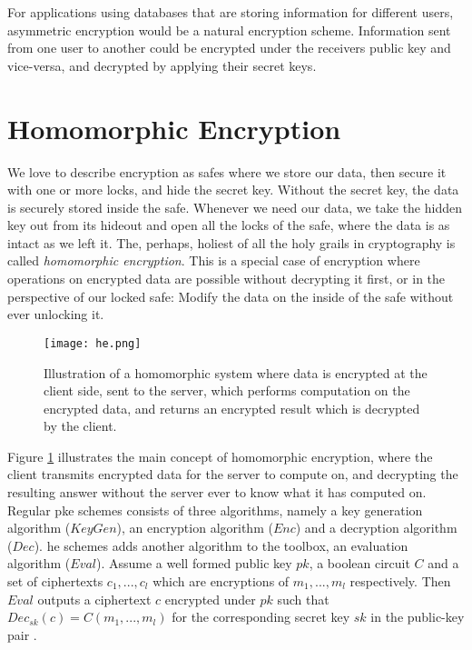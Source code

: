 For applications using databases that are storing information for different users, asymmetric encryption would be a natural encryption scheme. Information sent from one user to another could be encrypted under the receivers public key and vice-versa, and decrypted by applying their secret keys.

\section{Homomorphic Encryption}

We love to describe encryption as safes where we store our data, then secure it with one or more locks, and hide the secret key. Without the secret key, the data is securely stored inside the safe. Whenever we need our data, we take the hidden key out from its hideout and open all the locks of the safe, where the data is as intact as we left it. The, perhaps, holiest of all the holy grails in cryptography is called \emph{homomorphic encryption}. This is a special case of encryption where operations on encrypted data are possible without decrypting it first, or in the perspective of our locked safe: Modify the data on the inside of the safe without ever unlocking it.

\begin{figure}[h]
	\centering
	\texttt{[image: he.png]}
	\caption{Illustration of a homomorphic system where data is encrypted at the client side, sent to the server, which performs computation on the encrypted data, and returns an encrypted result which is decrypted by the client.}
	\label{fig:he_ill}
\end{figure}

Figure \ref{fig:he_ill} illustrates the main concept of homomorphic encryption, where the client transmits encrypted data for the server to compute on, and decrypting the resulting answer without the server ever to know what it has computed on. Regular \gls{pke} schemes consists of three algorithms, namely a key generation algorithm ($KeyGen$), an encryption algorithm ($Enc$) and a decryption algorithm ($Dec$). \gls{he} schemes adds another algorithm to the toolbox, an evaluation algorithm ($Eval$).  Assume a well formed public key $pk$, a boolean circuit $C$ and a set of ciphertexts $c_1, ..., c_l$ which are encryptions of $m_1, ..., m_l$ respectively. Then $Eval$ outputs a ciphertext $c$ encrypted under $pk$ such that $Dec_{sk}(c) = C(m_1, ..., m_l)$ for the corresponding secret key $sk$ in the public-key pair \cite{damgaard2012secure}.


